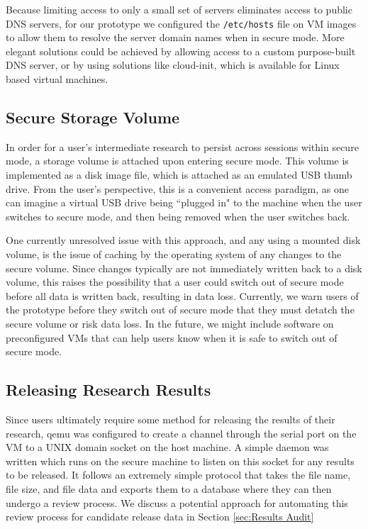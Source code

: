 \documentclass{acm_proc_article-sp}
\begin{document}
Because limiting access to only a small set of servers eliminates access to
public DNS servers, for our prototype we configured the \texttt{/etc/hosts} file
on VM images to allow them to resolve the server domain names when in secure
mode.  More elegant solutions could be achieved by allowing access to a
custom purpose-built DNS server, or by using solutions like cloud-init, which is
available for Linux based virtual machines.

\subsection{Secure Storage Volume}

In order for a user's intermediate research to persist across sessions within
secure mode, a storage volume is attached upon entering secure mode.  This
volume is implemented as a disk image file, which is attached as an emulated USB
thumb drive.  From the user's perspective, this is a convenient access paradigm,
as one can imagine a virtual USB drive being ``plugged in" to the machine when
the user switches to secure mode, and then being removed when the user switches
back.

One currently unresolved issue with this approach, and any using a mounted disk
volume, is the issue of caching by the operating system of any changes to the
secure volume.  Since changes typically are not immediately written back to a
disk volume, this raises the possibility that a user could switch out of secure
mode before all data is written back, resulting in data loss.  Currently, we
warn users of the prototype before they switch out of secure mode that they must
detatch the secure volume or risk data loss.  In the future, we might include
software on preconfigured VMs that can help users know when it is safe to switch
out of secure mode.

\subsection{Releasing Research Results}

Since users ultimately require some method for releasing the results of their
research, qemu was configured to create a channel through the serial port on the
VM to a UNIX domain socket on the host machine.  A simple daemon was written
which runs on the secure machine to listen on this socket for any results to be
released.  It follows an extremely simple protocol that takes the file name,
file size, and file data and exports them to a database where they can then
undergo a review process.  We discuss a potential approach for automating this
review process for candidate release data in Section \ref{sec:Results Audit}
\end{document}

